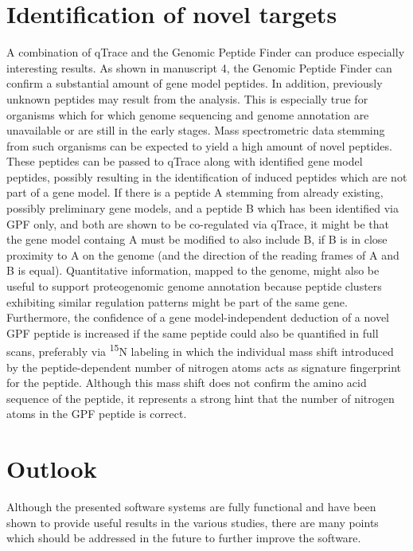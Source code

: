 \section{Identification of novel targets}

A combination of qTrace and the Genomic Peptide Finder can produce especially
interesting results.
As shown in manuscript 4, the Genomic Peptide Finder can confirm a substantial
amount of gene model peptides.
In addition, previously unknown peptides may result from the analysis.
This is especially true for organisms which for which genome sequencing and
genome annotation are unavailable or are still in the early stages.
Mass spectrometric data stemming from such organisms can be expected to
yield a high amount of novel peptides.
These peptides can be passed to qTrace along with identified gene model 
peptides, possibly resulting in the identification of induced peptides which
are not part of a gene model.
If there is a peptide A stemming from already existing, possibly preliminary gene
models, and a peptide B which has been identified via GPF only, and both
are shown to be co-regulated via qTrace, it might be that the gene model
containg A must be modified to also include B, if B is in close proximity to A
on the genome (and the direction of the reading frames of A and B is equal).
Quantitative information, mapped to the genome, might also be useful to
support proteogenomic genome annotation because peptide clusters exhibiting 
similar regulation patterns might be part of the same gene.
Furthermore, the confidence of a gene model-independent deduction of a novel 
GPF peptide is increased if the same peptide could also be quantified in full
scans, preferably via \textsuperscript{15}N labeling in which the individual
mass shift introduced by the peptide-dependent number of nitrogen atoms acts
as signature fingerprint for the peptide.
Although this mass shift does not confirm the amino acid sequence of the 
peptide, it represents a strong hint that the number of nitrogen atoms in
the GPF peptide is correct.

\section{Outlook}

Although the presented software systems are fully functional and have been
shown to provide useful results in the various studies, there are many
points which should be addressed in the future to further improve the software.

